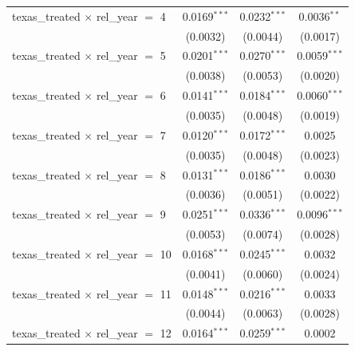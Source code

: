 \begin{tabular}{lccc}
   texas\_treated $\times$ rel\_year $=$ 4      & 0.0169$^{***}$        & 0.0232$^{***}$         & 0.0036$^{**}$\\   
                                                & (0.0032)              & (0.0044)               & (0.0017)\\   
   texas\_treated $\times$ rel\_year $=$ 5      & 0.0201$^{***}$        & 0.0270$^{***}$         & 0.0059$^{***}$\\   
                                                & (0.0038)              & (0.0053)               & (0.0020)\\   
   texas\_treated $\times$ rel\_year $=$ 6      & 0.0141$^{***}$        & 0.0184$^{***}$         & 0.0060$^{***}$\\   
                                                & (0.0035)              & (0.0048)               & (0.0019)\\   
   texas\_treated $\times$ rel\_year $=$ 7      & 0.0120$^{***}$        & 0.0172$^{***}$         & 0.0025\\   
                                                & (0.0035)              & (0.0048)               & (0.0023)\\   
   texas\_treated $\times$ rel\_year $=$ 8      & 0.0131$^{***}$        & 0.0186$^{***}$         & 0.0030\\   
                                                & (0.0036)              & (0.0051)               & (0.0022)\\   
   texas\_treated $\times$ rel\_year $=$ 9      & 0.0251$^{***}$        & 0.0336$^{***}$         & 0.0096$^{***}$\\   
                                                & (0.0053)              & (0.0074)               & (0.0028)\\   
   texas\_treated $\times$ rel\_year $=$ 10     & 0.0168$^{***}$        & 0.0245$^{***}$         & 0.0032\\   
                                                & (0.0041)              & (0.0060)               & (0.0024)\\   
   texas\_treated $\times$ rel\_year $=$ 11     & 0.0148$^{***}$        & 0.0216$^{***}$         & 0.0033\\   
                                                & (0.0044)              & (0.0063)               & (0.0028)\\   
   texas\_treated $\times$ rel\_year $=$ 12     & 0.0164$^{***}$        & 0.0259$^{***}$         & 0.0002\\   

\end{tabular}
